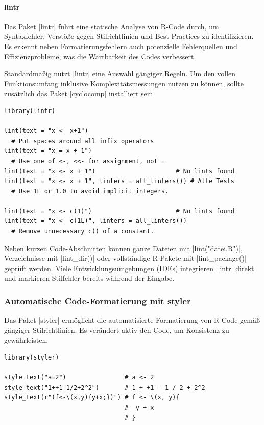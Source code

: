 \documentclass[10pt,twocolumn]{scrartcl}
\renewcommand{\lstinline}{\mycoloredinline}
\begin{document}
\paragraph{lintr}

Das Paket \lstinline|lintr| führt eine statische Analyse von R-Code durch, um Syntaxfehler, Verstöße gegen Stilrichtlinien und Best Practices zu identifizieren. Es erkennt neben Formatierungsfehlern auch potenzielle Fehlerquellen und Effizienzprobleme, was die Wartbarkeit des Codes verbessert.

Standardmäßig nutzt \lstinline|lintr| eine Auswahl gängiger Regeln. Um den vollen Funktionsumfang inklusive Komplexitätsmessungen nutzen zu können, sollte zusätzlich das Paket \lstinline|cyclocomp| installiert sein.

\begin{lstlisting}
library(lintr)

lint(text = "x <- x+1")
  # Put spaces around all infix operators
lint(text = "x = x + 1")
  # Use one of <-, <<- for assignment, not =
lint(text = "x <- x + 1")                      # No lints found
lint(text = "x <- x + 1", linters = all_linters()) # Alle Tests
  # Use 1L or 1.0 to avoid implicit integers.

lint(text = "x <- c(1)")                       # No lints found
lint(text = "x <- c(1L)", linters = all_linters())
  # Remove unnecessary c() of a constant.
\end{lstlisting}

Neben kurzen Code-Abschnitten können ganze Dateien mit \lstinline|lint("datei.R")|, Verzeichnisse mit \lstinline|lint_dir()| oder vollständige R-Pakete mit \lstinline|lint_package()| geprüft werden. Viele Entwicklungsumgebungen (IDEs) integrieren \lstinline|lintr| direkt und markieren Stilfehler bereits während der Eingabe.


\subsubsection{Automatische Code-Formatierung mit styler}

Das Paket \lstinline|styler| ermöglicht die automatisierte Formatierung von R-Code gemäß gängiger Stilrichtlinien. Es verändert aktiv den Code, um Konsistenz zu gewährleisten.

\begin{lstlisting}
library(styler)

style_text("a=2")                # a <- 2
style_text("1++1-1/2+2^2")       # 1 + +1 - 1 / 2 + 2^2
style_text(r"(f<-\(x,y){y+x;})") # f <- \(x, y){
                                 #  y + x
                                 # }
\end{lstlisting}
\end{document}
